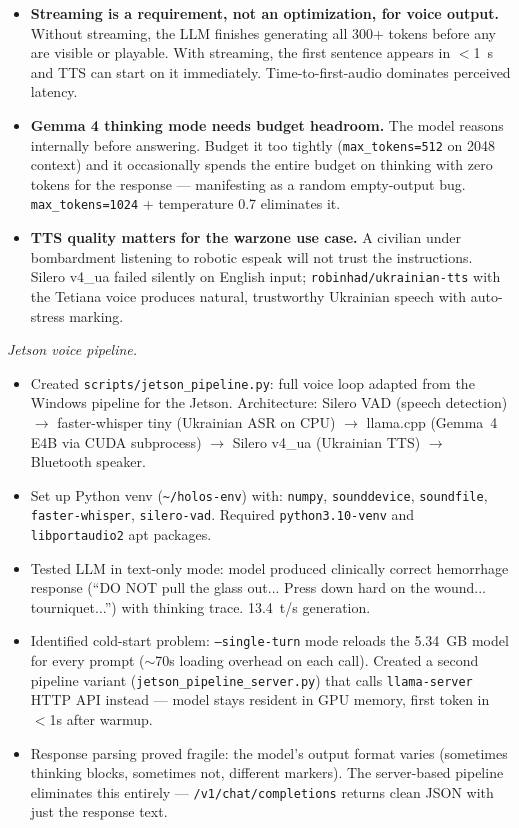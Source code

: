 \documentclass{article}
\theoremstyle{plain}
\theoremstyle{definition}
\theoremstyle{remark}
\begin{document}
\begin{itemize}
\item \textbf{Streaming is a requirement, not an optimization, for voice output.} Without streaming, the LLM finishes generating all 300+ tokens before any are visible or playable. With streaming, the first sentence appears in $<$1~s and TTS can start on it immediately. Time-to-first-audio dominates perceived latency.
\item \textbf{Gemma 4 thinking mode needs budget headroom.} The model reasons internally before answering. Budget it too tightly (\texttt{max\_tokens=512} on 2048 context) and it occasionally spends the entire budget on thinking with zero tokens for the response --- manifesting as a random empty-output bug. \texttt{max\_tokens=1024} + temperature 0.7 eliminates it.
\item \textbf{TTS quality matters for the warzone use case.} A civilian under bombardment listening to robotic espeak will not trust the instructions. Silero v4\_ua failed silently on English input; \texttt{robinhad/ukrainian-tts} with the Tetiana voice produces natural, trustworthy Ukrainian speech with auto-stress marking.
\end{itemize}

\textit{Jetson voice pipeline.}
\begin{itemize}
\item Created \texttt{scripts/jetson\_pipeline.py}: full voice loop adapted from the Windows pipeline for the Jetson. Architecture: Silero VAD (speech detection) $\rightarrow$ faster-whisper tiny (Ukrainian ASR on CPU) $\rightarrow$ llama.cpp (Gemma~4 E4B via CUDA subprocess) $\rightarrow$ Silero v4\_ua (Ukrainian TTS) $\rightarrow$ Bluetooth speaker.
\item Set up Python venv (\texttt{\~{}/holos-env}) with: \texttt{numpy}, \texttt{sounddevice}, \texttt{soundfile}, \texttt{faster-whisper}, \texttt{silero-vad}. Required \texttt{python3.10-venv} and \texttt{libportaudio2} apt packages.
\item Tested LLM in text-only mode: model produced clinically correct hemorrhage response (``DO NOT pull the glass out... Press down hard on the wound... tourniquet...'') with thinking trace. 13.4~t/s generation.
\item Identified cold-start problem: \texttt{--single-turn} mode reloads the 5.34~GB model for every prompt ($\sim$70s loading overhead on each call). Created a second pipeline variant (\texttt{jetson\_pipeline\_server.py}) that calls \texttt{llama-server} HTTP API instead --- model stays resident in GPU memory, first token in $<$1s after warmup.
\item Response parsing proved fragile: the model's output format varies (sometimes thinking blocks, sometimes not, different markers). The server-based pipeline eliminates this entirely --- \texttt{/v1/chat/completions} returns clean JSON with just the response text.
\end{itemize}
\end{document}
